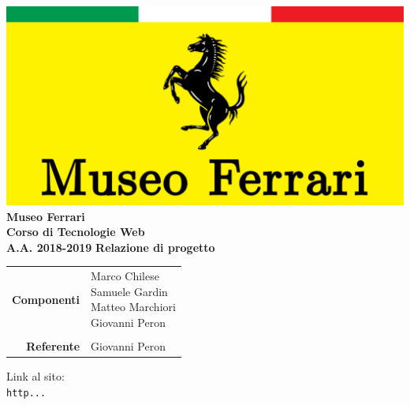 


\begin{titlepage}
\thispagestyle{empty}

\begin{center}

\includegraphics[scale=0.25]{Images/logo.pdf}\\ 
\large \textbf{Museo Ferrari\\ \small Corso di Tecnologie Web\\ A.A. 2018-2019}
\vfill
\Huge \textbf{Relazione di progetto}
\vfill
\large
\renewcommand{\arraystretch}{1.3}
\begin{tabular}{r|l}
\textbf{Componenti} & \parbox[t]{5cm}{Marco Chilese\\Samuele Gardin\\Matteo Marchiori\\Giovanni Peron}\\
\-\\
\textbf{Referente} & \parbox[t]{5cm}{Giovanni Peron}\\
\end{tabular}
\vfill
\small
Link al sito:\\
\texttt{http...}
\end{center}
\end{titlepage}

\pagebreak

\tableofcontents

\pagebreak




\pagebreak



\pagebreak



\pagebreak



\pagebreak




\pagebreak




